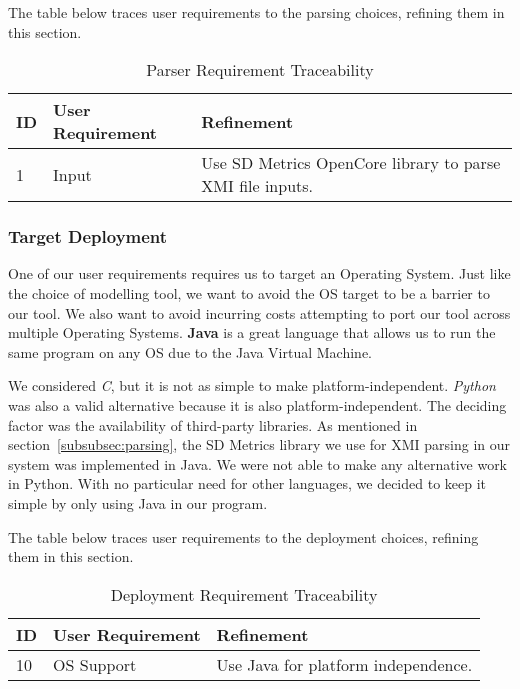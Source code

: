 The table below traces user requirements to the parsing choices, refining them in this section.
\begin{table}[htbp]
    \centering
    \caption{Parser Requirement Traceability}\label{tab:parse-choice-table}
    \begin{tabularx}{\textwidth}{| l | l | X |}
        \hline
        \textbf{ID} & \textbf{User Requirement} & \textbf{Refinement} \\
        \hline
        1 & Input & Use SD Metrics OpenCore library to parse XMI file inputs. \\ \hline
    \end{tabularx}
\end{table}

\newpage
\subsubsection{Target Deployment}
One of our user requirements requires us to target an Operating System.
Just like the choice of modelling tool, we want to avoid the OS target to be a barrier to our tool.
We also want to avoid incurring costs attempting to port our tool across multiple Operating Systems.
\textbf{Java} is a great language that allows us to run the same program on any OS due to the Java Virtual Machine.

We considered \textit{C}, but it is not as simple to make platform-independent.
\textit{Python} was also a valid alternative because it is also platform-independent.
The deciding factor was the availability of third-party libraries.
As mentioned in section~\ref{subsubsec:parsing}, the SD Metrics library we use for XMI parsing in our system was implemented in Java.
We were not able to make any alternative work in Python.
With no particular need for other languages, we decided to keep it simple by only using Java in our program.

The table below traces user requirements to the deployment choices, refining them in this section.
\begin{table}[htbp]
    \centering
    \caption{Deployment Requirement Traceability}\label{tab:os-choice-table}
    \begin{tabularx}{\textwidth}{| l | l | X |}
        \hline
        \textbf{ID} & \textbf{User Requirement} & \textbf{Refinement} \\
        \hline
        10 & OS Support & Use Java for platform independence. \\ \hline
    \end{tabularx}
\end{table}

